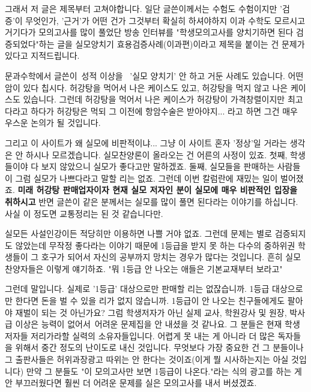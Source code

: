 그래서 저 글은 제목부터 고쳐야합니다.
일단 글쓴이께서는 수험도 수험이지만 '검증'이 무엇인가, '근거'가 어떤 건가 그것부터 확실히 하셔야하지
이과 수학도 모르시고 거기다가 모의고사를 많이 풀었단 방송 인터뷰를 "학생모의고사를 양치기하면 된다 검증되었다"하는 글을
실모양치기 효용검증사례(이과편)이라고 제목을 붙이는 건 문제가 있다고 지적드립니다.
\vspace{5mm}

문과수학에서 글쓴이 성적 이상을  '실모 양치기' 안 하고 거둔 사례도 있습니다.
어떤 암이 있다 칩시다. 허강탕을 먹어서 나은 케이스도 있고, 허강탕을 먹지 않고 나은 케이스도 있습니다.
그런데 허강탕을 먹어서 나은 케이스가 허강탕이 가격창렬이지만 최고다라고 하다가
허강탕은 먹되 그 이전에 항암수술은 받아야지... 라고 하면 그건 매우 우스운 논의가 될 것입니다.
\vspace{5mm}

그리고 이 사이트가 왜 실모에 비판적이냐... 그냥 이 사이트 혼자 '정상'일 거라는 생각은 안 하시나 모르겠습니다.
실모찬양론이 올라오는 건 어른의 사정이 있죠.
첫째, 학생들이야 다 보지 않았으니 실모가 좋다고만 말하겠죠.
둘째, 실모들을 판매하는 사람들이 그럼 실모가 나쁘다라고 말할 리는 없죠.
그런데 이번 칼럼란에 재밌는 일이 벌어졌죠.
\textbf{미래 허강탕 판매업자이자 현재 실모 저자인 분이 실모에 매우 비판적인 입장을 취하시고}
반면 글쓴이 같은 분께서는 실모를 많이 풀면 된다라는 이야기를 하십니다.
사실 이 정도면 교통정리는 된 것 같습니다만.
\vspace{5mm}

실모든 사설인강이든 적당히만 이용하면 나쁠 거야 없죠.
그런데 문제는 별로 검증되지도 않았는데 무작정 좋다라는 이야기 때문에
1등급을 받지 못 하는 다수의 중하위권 학생들이 그 호구가 되어서 자신의 공부까지 망치는 경우가 많다는 것입니다.
흔히 실모찬양자들은 이렇게 얘기하죠. "뭐 1등급 안 나오는 애들은 기본교재부터 보라고"
\vspace{5mm}

그런데 말입니다. 실제로 '1등급' 대상으로만 판매할 리는 없잖습니까.
1등급 대상으로만 한다면 돈을 벌 수 있을 리가 없지 않습니까. 1등급이 안 나오는 친구들에게도 팔아야 재벌이 되는 것 아닌가요?
그럼 학생저자가 아닌 실제 교사, 학원강사 및 원장, 박사급 이상은 능력이 없어서 어려운 문제집을 안 내셨을 것 같나요.
그 분들은 현재 학생저자들 저리가라할 실력의 소유자들입니다.
어렵게 못 내는 게 아니라 더 많은 독자들을 위해서 중간 정도의 난이도로 내신 것입니다.
무엇보다 가장 중요한 건 그 분들이나 그 출판사들은 허위과장광고 따위는 안 한다는 것이죠(이게 뭘 시사하는지는 아실 것입니다)
만약 그 분들도 "이 모의고사만 보면 1등급이 나온다."라는 식의 광고를 하는 게 안 부끄러웠다면
훨씬 더 어려운 문제를 실은 모의고사를 내서 버셨겠죠.
\vspace{5mm}

